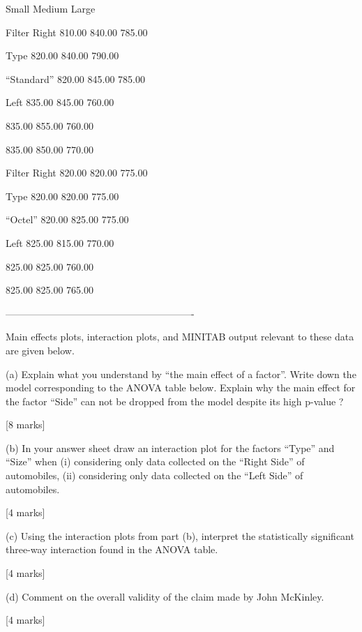Small Medium Large

Filter Right 810.00 840.00 785.00

Type 820.00 840.00 790.00

“Standard” 820.00 845.00 785.00

Left 835.00 845.00 760.00

835.00 855.00 760.00

835.00 850.00 770.00

Filter Right 820.00 820.00 775.00

Type 820.00 820.00 775.00

“Octel” 820.00 825.00 775.00

Left 825.00 815.00 770.00

825.00 825.00 760.00

825.00 825.00 765.00

----------------------------------------------------------



Main effects plots, interaction plots, and MINITAB output relevant to these data are given below.

(a) Explain what you understand by “the main effect of a factor”. Write down the model corresponding to the ANOVA table below. Explain why the main effect for the factor “Side” can not be dropped from the model despite its high p-value ?

[8 marks]

(b) In your answer sheet draw an interaction plot for the factors “Type” and “Size” when (i) considering only data collected on the “Right Side” of automobiles, (ii) considering only data collected on the “Left Side” of automobiles.

[4 marks]

(c) Using the interaction plots from part (b), interpret the statistically significant three-way interaction found in the ANOVA table.

[4 marks]

(d) Comment on the overall validity of the claim made by John McKinley.

[4 marks]

\newpage


